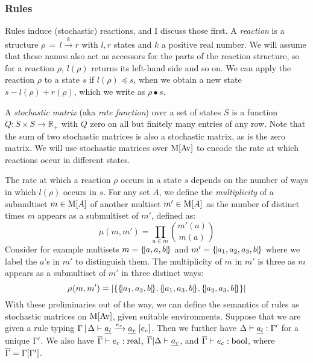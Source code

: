 \subsubsection*{Rules}
\label{sec:ruleSem}
Rules induce (stochastic) reactions, and I discuss those first. A
\emph{reaction} is a structure $\rho \, = \, l \xrightarrow{k} r$ with $l, r$
states and $k$ a positive real number. We will assume that these names also act
as accessors for the parts of the reaction structure, so for a reaction $\rho$,
$l(\rho)$ returns its left-hand side and so on. We can apply the reaction $\rho$ to a
state $s$ if $l(\rho) \preceq s$, when we obtain a new state
$s - l(\rho) + r(\rho) $, which we write as $\rho \bullet s$.

A \emph{stochastic matrix} (aka \emph{rate function}) over a set of states $S$
is a function $Q: S \times S \rightarrow \mathbb{R}_+$ with $Q$ zero on all but finitely many
entries of any row.  Note that the sum of two stochastic matrices is also a
stochastic matrix, as is the zero matrix.  We will use stochastic matrices over
$\mathrm{M}[\mathrm{Av}]$ to encode the rate at which reactions occur in different
states.

The rate at which a reaction $\rho$ occurs in a state $s$ depends on the number of
ways in which $l(\rho)$ occurs in $s$.  For any set $A$, we define the
\emph{multiplicity} of a submultiset $m \in \mathrm{M}[A]$ of another multiset
$m' \in \mathrm{M}[A]$ as the number of distinct times $m$ appears as a submultiset of
$m'$, defined as:
%
$$
\mu(m, m') = \prod_{a \in m}  \binom{m'(a)}{m(a)}
$$
Consider for example multisets $m = \{\!| a, a, b |\!\}$ and $m'= \{\!| a_1, a_2, a_3, b |\!\}$
where we label the $a$'s in $m'$ to distinguish them.  The multiplicity of $m$
in $m'$ is three as $m$ appears as a submultiset of $m'$ in three distinct ways:
$$
\mu(m, m') = |\{ \{\!| a_1, a_2, b |\!\}, \{\!| a_1, a_3, b |\!\}, \{\!| a_2, a_3, b |\!\} \}|$$ With these
preliminaries out of the way, we can define the semantics of rules as stochastic
matrices on $\mathrm{M}[\mathrm{Av}]$, given suitable environments.  Suppose that we
are given a rule typing
$\Gamma\,|\, \Delta \vdash \underline{a_l} \xrightarrow{e_r} \underline{a_r} \; [e_c]$. Then we further
have $\Delta \vdash \underline{a_l} : \Gamma'$ for a unique $\Gamma'$.  We also have
$\overline{\Gamma} \vdash e_r : \mathrm{real}$, $ \overline{\Gamma}|\Delta \vdash \underline{a_r}$, and
$ \overline{\Gamma} \vdash e_c : \mathrm{bool}$, where $\overline{\Gamma} = \Gamma[\Gamma']$.


